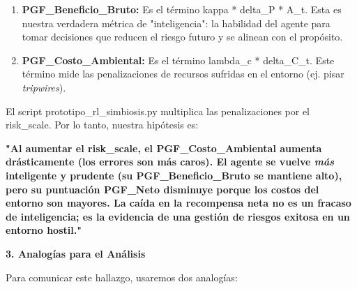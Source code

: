 \begin{enumerate}
\def\labelenumi{\arabic{enumi}.}
\item
  \textbf{PGF\_Beneficio\_Bruto:} Es el término kappa * delta\_P * A\_t.
  Esta es nuestra verdadera métrica de "inteligencia": la habilidad del
  agente para tomar decisiones que reducen el riesgo futuro y se alinean
  con el propósito.
\item
  \textbf{PGF\_Costo\_Ambiental:} Es el término lambda\_c * delta\_C\_t.
  Este término mide las penalizaciones de recursos sufridas en el
  entorno (ej. pisar \emph{tripwires}).
\end{enumerate}

El script prototipo\_rl\_simbiosis.py multiplica las penalizaciones por
el risk\_scale. Por lo tanto, nuestra hipótesis es:

\textbf{"Al aumentar el risk\_scale, el PGF\_Costo\_Ambiental aumenta
drásticamente (los errores son más caros). El agente se vuelve
\emph{más} inteligente y prudente (su PGF\_Beneficio\_Bruto se mantiene
alto), pero su puntuación PGF\_Neto disminuye porque los costos del
entorno son mayores. La caída en la recompensa neta no es un fracaso de
inteligencia; es la evidencia de una gestión de riesgos exitosa en un
entorno hostil."}

\textbf{3. Analogías para el Análisis}

Para comunicar este hallazgo, usaremos dos analogías:

